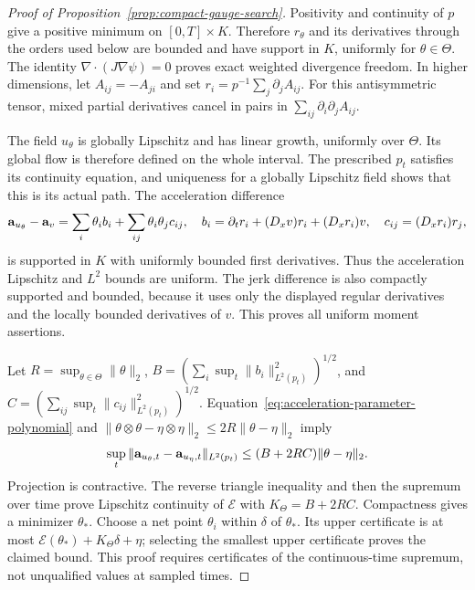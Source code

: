 \begin{proof}[Proof of Proposition~\ref{prop:compact-gauge-search}]
Positivity and continuity of $p$ give a positive minimum on
$[0,T]\times K$.  Therefore $r_\theta$ and its derivatives through the
orders used below are bounded and have support in $K$, uniformly for
$\theta\in\Theta$.  The identity
$\nabla\cdot(J\nabla\psi)=0$ proves exact weighted divergence
freedom.  In higher dimensions, let $A_{ij}=-A_{ji}$ and set
$r_i=p^{-1}\sum_j\partial_jA_{ij}$. For this antisymmetric tensor, mixed partial
derivatives cancel in pairs in
$\sum_{ij}\partial_i\partial_jA_{ij}$.

The field $u_\theta$ is globally Lipschitz and has linear growth,
uniformly over $\Theta$.  Its global flow is therefore defined on the
whole interval.  The prescribed $p_t$ satisfies its continuity equation,
and uniqueness for a globally Lipschitz field shows that this is its
actual path.  The acceleration difference
\begin{equation}
 \mathbf a_{u_\theta}-\mathbf a_v
 =\sum_i\theta_i b_i+\sum_{ij}\theta_i\theta_jc_{ij},
 \quad
 b_i=\partial_tr_i+(D_xv)r_i+(D_xr_i)v,
 \quad c_{ij}=(D_xr_i)r_j,
 \label{eq:acceleration-parameter-polynomial}
\end{equation}
is supported in $K$ with uniformly bounded first derivatives.  Thus
the acceleration Lipschitz and $L^2$ bounds are uniform.  The jerk
difference is also compactly supported and bounded, because it uses
only the displayed regular derivatives and the locally bounded
derivatives of $v$.  This proves all uniform moment assertions.

Let $R=\sup_{\theta\in\Theta}\|\theta\|_2$,
$B=(\sum_i\sup_t\|b_i\|_{L^2(p_t)}^2)^{1/2}$, and
$C=(\sum_{ij}\sup_t\|c_{ij}\|_{L^2(p_t)}^2)^{1/2}$.
Equation~\eqref{eq:acceleration-parameter-polynomial} and
$\|\theta\otimes\theta-\eta\otimes\eta\|_2
\le2R\|\theta-\eta\|_2$ imply
\[
 \sup_t\|\mathbf a_{u_\theta,t}-\mathbf a_{u_\eta,t}\|_{L^2(p_t)}
 \le(B+2RC)\|\theta-\eta\|_2.
\]
Projection is contractive.  The reverse triangle inequality and then
the supremum over time prove Lipschitz continuity of $\mathcal E$ with
$K_\Theta=B+2RC$.  Compactness gives a minimizer $\theta_*$.  Choose
a net point $\theta_i$ within $\delta$ of $\theta_*$.  Its upper
certificate is at most
$\mathcal E(\theta_*)+K_\Theta\delta+\eta$; selecting the smallest
upper certificate proves the claimed bound.  This proof requires
certificates of the continuous-time supremum, not unqualified values
at sampled times.


\end{proof}
